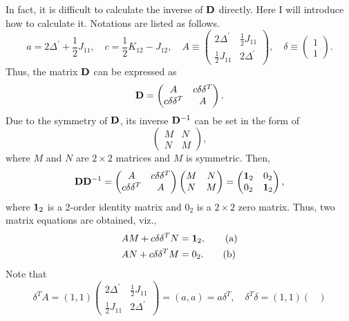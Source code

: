 \documentclass[a4paper]{book}
\newcounter{solution}[chapter]
\newcommand{\D}{{\bf D}}
\newcommand{\I}{{\bf 1}}
\begin{document}
\begin{solution}
\begin{itemize}
	In fact, it is difficult to calculate the inverse of $\D$ directly. Here I will introduce how to calculate it. Notations are listed as follows.
	\[
		a = 2\Delta^\prime + \frac{1}{2} J_{11}, \quad c= \frac{1}{2} K_{12} - J_{12} , \quad  A \equiv \begin{pmatrix}
			2 \Delta^\prime & \frac{1}{2} J_{11} \\ \frac{1}{2} J_{11} & 2 \Delta^\prime
		\end{pmatrix}, \quad \delta \equiv \begin{pmatrix}
			1 \\ 1
		\end{pmatrix}.
	\]
	Thus, the matrix $\D$ can be expressed as
	\[
		\D = \begin{pmatrix}
			A & c \delta \delta^T \\
			c \delta \delta^T & A 
		\end{pmatrix}.
	\]
	Due to the symmetry of $\D$, its inverse $\D^{-1}$ can be set in the form of
	\[
		\begin{pmatrix}
			M & N \\
			N & M
		\end{pmatrix},
	\]
	where $M$ and $N$ are $2\times2$ matrices and $M$ is symmetric. Then,
	\[
		\D \D^{-1} = \begin{pmatrix}
			A & c \delta \delta^T \\
			c \delta \delta^T & A 
		\end{pmatrix} \begin{pmatrix}
			M & N \\
			N & M
		\end{pmatrix} = \begin{pmatrix}
			\I_2 & 0_2 \\
			0_2 & \I_2
		\end{pmatrix},
	\]
	where $\I_2$ is a 2-order identity matrix and $0_2$ is a $2 \times 2$ zero matrix. Thus, two matrix equations are obtained, viz.,
	\begin{align*}
		AM + c \delta \delta^T N &= \I_2 , \tag{a} \\
		AN + c \delta \delta^T M &= 0_2 . \tag{b}
	\end{align*}
	Note that
	\[
		\delta^T A = (1,1) \begin{pmatrix}
			2 \Delta^\prime & \frac{1}{2} J_{11} \\ \frac{1}{2} J_{11} & 2 \Delta^\prime
		\end{pmatrix} = ( a , a ) = a \delta^T, \quad \delta^T \delta = (1,1) \begin{pmatrix}

\end{pmatrix}\]
\end{itemize}
\end{solution}
\end{document}

